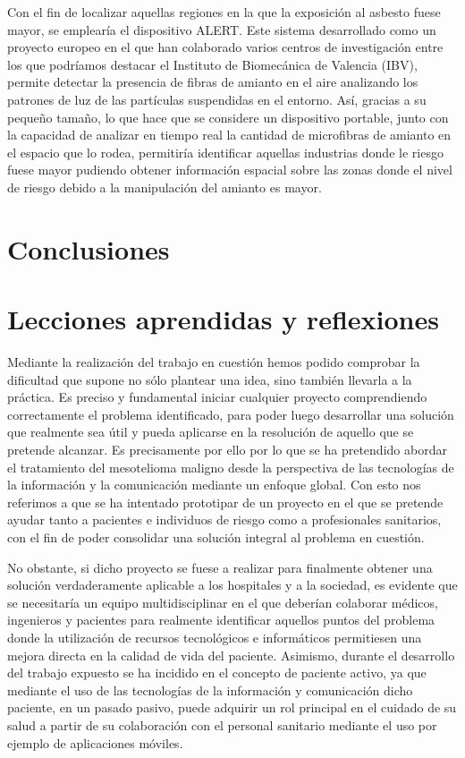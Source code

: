 \documentclass{article}
\begin{document}
Con el fin de localizar aquellas regiones en la que la	exposición  al
asbesto fuese mayor, se emplearía el dispositivo ALERT.  Este  sistema
desarrollado como un proyecto europeo en el que han colaborado	varios
centros de investigación entre los que podríamos destacar el Instituto
de Biomecánica de Valencia (IBV), permite  detectar  la  presencia  de
fibras de amianto en el aire analizando los patrones  de  luz  de  las
partículas suspendidas en el  entorno.	 Así,  gracias	a  su  pequeño
tamaño, lo que hace que se considere un  dispositivo  portable,  junto
con la capacidad de analizar en tiempo real la cantidad de microfibras
de amianto en el espacio que lo rodea, permitiría identificar aquellas
industrias donde le riesgo fuese mayor	pudiendo  obtener  información
espacial sobre las  zonas  donde  el  nivel  de  riesgo  debido  a  la
manipulación del amianto es mayor.

\section{Conclusiones}

\section{Lecciones aprendidas y reflexiones}

Mediante la realización del trabajo en cuestión hemos podido comprobar
la dificultad que supone no  sólo  plantear  una  idea,  sino  también
llevarla a la práctica.  Es preciso y  fundamental  iniciar  cualquier
proyecto comprendiendo correctamente el  problema  identificado,  para
poder luego desarrollar una solución que realmente sea	útil  y  pueda
aplicarse en la resolución de aquello que se  pretende	alcanzar.   Es
precisamente  por  ello  por  lo  que  se  ha  pretendido  abordar  el
tratamiento del  mesotelioma  maligno  desde  la  perspectiva  de  las
tecnologías de la información y la comunicación  mediante  un  enfoque
global.  Con esto nos referimos a que se ha intentado prototipar de un
proyecto en el que se pretende ayudar tanto a pacientes  e  individuos
de riesgo como	a  profesionales  sanitarios,  con  el	fin  de  poder
consolidar  una   solución   integral	al   problema	en   cuestión.

No obstante, si dicho proyecto se fuese  a  realizar  para  finalmente
obtener una solución verdaderamente aplicable a los hospitales y a  la
sociedad, es evidente que se necesitaría un equipo multidisciplinar en
el  que  deberían  colaborar  médicos,	ingenieros  y  pacientes  para
realmente  identificar	aquellos  puntos   del	 problema   donde   la
utilización de recursos tecnológicos e	informáticos  permitiesen  una
mejora directa en la calidad de vida del paciente.  Asimismo,  durante
el desarrollo del trabajo expuesto se ha incidido en  el  concepto  de
paciente activo, ya que mediante el  uso  de  las  tecnologías	de  la
información y comunicación dicho paciente, en un pasado pasivo,  puede
adquirir un rol principal en el cuidado de su salud  a	partir	de  su
colaboración con el personal sanitario mediante el uso por ejemplo  de
aplicaciones móviles.
\end{document}
